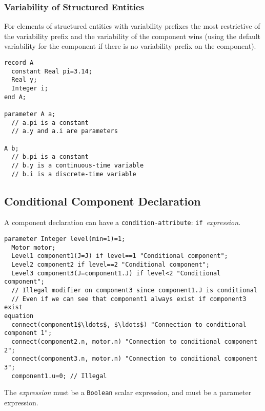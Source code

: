 \subsubsection{Variability of Structured Entities}\label{variability-of-structured-entities}

For elements of structured entities with variability prefixes the most
restrictive of the variability prefix and the variability of the
component wins (using the default variability for the component if there
is no variability prefix on the component).

\begin{example}
\begin{lstlisting}[language=modelica]
record A
  constant Real pi=3.14;
  Real y;
  Integer i;
end A;

parameter A a;
  // a.pi is a constant
  // a.y and a.i are parameters

A b;
  // b.pi is a constant
  // b.y is a continuous-time variable
  // b.i is a discrete-time variable
\end{lstlisting}
\end{example}

\subsection{Conditional Component Declaration}\label{conditional-component-declaration}

A component declaration can have a \lstinline!condition-attribute!: \lstinline!if!~\emph{expression}.

\begin{example}
\begin{lstlisting}[language=modelica]
  parameter Integer level(min=1)=1;
  Motor motor;
  Level1 component1(J=J) if level==1 "Conditional component";
  Level2 component2 if level==2 "Conditional component";
  Level3 component3(J=component1.J) if level<2 "Conditional component";
  // Illegal modifier on component3 since component1.J is conditional
  // Even if we can see that component1 always exist if component3 exist
equation
  connect(component1$\ldots$, $\ldots$) "Connection to conditional component 1";
  connect(component2.n, motor.n) "Connection to conditional component 2";
  connect(component3.n, motor.n) "Connection to conditional component 3";
  component1.u=0; // Illegal
\end{lstlisting}
\end{example}

The \emph{expression} must be a \lstinline!Boolean! scalar expression, and must be a parameter expression.

